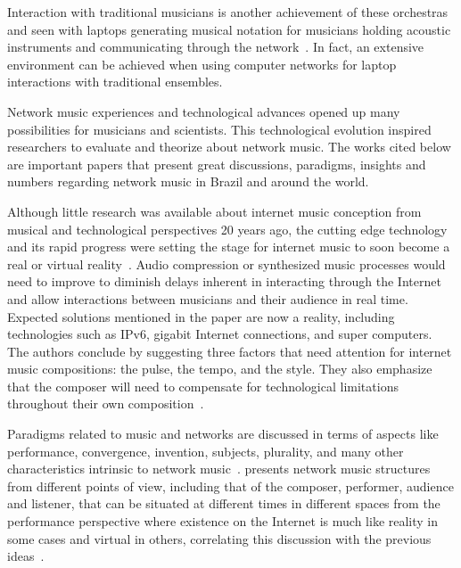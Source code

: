 Interaction with traditional musicians is another achievement of these orchestras and seen with laptops generating musical notation for musicians holding acoustic instruments and communicating through the network~\citep{Lee2013mixed}.
In fact, an extensive environment can be achieved when using computer networks for laptop interactions with traditional ensembles.

Network music experiences and technological advances opened up many possibilities for musicians and scientists.
This technological evolution inspired researchers to evaluate and theorize about network music.
The works cited below are important papers that present great discussions, paradigms, insights and numbers regarding network music in Brazil and around the world.

Although little research was available about internet music conception from musical and technological perspectives 20 years ago, the cutting edge technology and its rapid progress were setting the stage for internet music to soon become a real or virtual reality~\citep{Kon1998internetmusic}.
Audio compression or synthesized music processes would need to improve to diminish delays inherent in interacting through the Internet and allow interactions between musicians and their audience in real time.
Expected solutions mentioned in the paper are now a reality, including technologies such as IPv6, gigabit Internet connections, and super computers.
The authors conclude by suggesting three factors that need attention for internet music compositions: the pulse, the tempo, and the style.
They also emphasize that the composer will need to compensate for technological limitations throughout their own composition~\cite{Kon1998internetmusic}.

Paradigms related to music and networks are discussed in terms of aspects like performance, convergence, invention, subjects, plurality, and many other characteristics intrinsic to network music~\citep{Tanzi2001observations}.
\citeauthor{Tanzi2001observations} presents network music structures from different points of view, including that of the composer, performer, audience and listener, that can be situated at different times in different spaces from the performance perspective where existence on the Internet is much like reality in some cases and virtual in others, correlating this discussion with the previous ideas~\citep{Kon1998internetmusic}.

